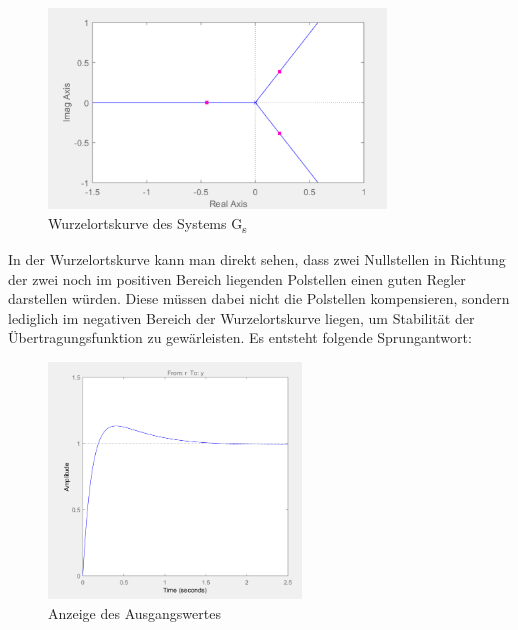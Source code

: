 \documentclass[10pt]{scrartcl}
\begin{document}
\begin{figure}[H]
	\centering
	\includegraphics[width=0.8\textwidth]{WOZ9f}
	\caption{Wurzelortskurve des Systems G\textsubscript{s}}
	\label{img:grafik-dummy}
\end{figure}

In der Wurzelortskurve kann man direkt sehen, dass zwei Nullstellen in Richtung der zwei noch im positiven Bereich liegenden Polstellen einen guten Regler darstellen würden. 
Diese müssen dabei nicht die Polstellen kompensieren, sondern lediglich im negativen Bereich der Wurzelortskurve liegen, um Stabilität der Übertragungsfunktion zu gewärleisten.
Es entsteht folgende Sprungantwort:

\begin{figure}[H]
	\centering
	\includegraphics[width=0.6\textwidth]{WOZ9f2}
	\caption{Anzeige des Ausgangswertes}
	\label{img:grafik-dummy}
\end{figure}
\end{document}
